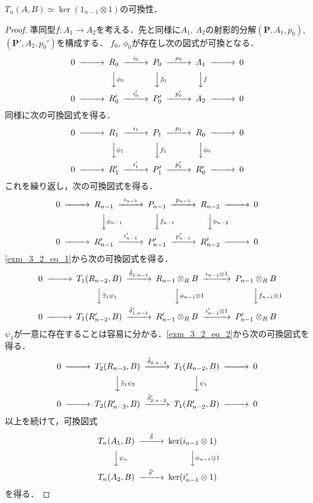\begin{screen}
  $T_n(A, B) \simeq \ker (1_{n-1} \otimes 1)$の可換性．
\end{screen}
\begin{proof}
  準同型$f \colon A_1 \to A_2$を考える．先と同様に$A_1$, $A_2$の射影的分解$(\boldsymbol{P}, A_1, p_0)$, $(\boldsymbol{P}', A_2, p_0')$を構成する．
  $f_0$, $\phi_0$が存在し次の図式が可換となる．
  \[
  \begin{CD}
    0 @>>> R_0 @>{i_0}>> P_0 @>{p_0}>> A_1 @>>> 0 \\
    @. @VV{\phi_0}V @VV{f_0}V @VV{f}V @. \\
    0 @>>> R_0' @>{i_0'}>> P_0' @>{p_0'}>> A_2 @>>> 0
  \end{CD}
  \]
  同様に次の可換図式を得る．
  \[
  \begin{CD}
    0 @>>> R_1 @>{i_1}>> P_1 @>{p_1}>> R_0 @>>> 0 \\
    @. @VV{\phi_1}V @VV{f_1}V @VV{\phi_0}V @. \\
    0 @>>> R_1' @>{i_1'}>> P_1' @>{p_1'}>> R_0' @>>> 0
  \end{CD}
  \]
  これを繰り返し，次の可換図式を得る．
  \begin{align}
    \begin{CD}
      0 @>>> R_{n-1} @>{i_{n-1}}>> P_{n-1} @>{p_{n-1}}>> R_{n-2} @>>> 0 \\
      @. @VV{\phi_{n-1}}V @VV{f_{n-1}}V @VV{\phi_{n-2}}V @. \\
      0 @>>> R_{n-1}' @>{i_{n-1}'}>> P_{n-1}' @>{p_{n-1}'}>> R_{n-2}' @>>> 0
    \end{CD}
    \label{exm_3_2_eq_3}
  \end{align}
  \eqref{exm_3_2_eq_1}から次の可換図式を得る．
  \[
  \begin{CD}
    0 @>>> T_1 (R_{n-2}, B) @>{\tilde{\delta}_{1, n-1}}>> R_{n-1} \otimes_R B @>{i_{n-1} \otimes 1}>> P_{n-1} \otimes_R B \\
    @. @VV{\exists_1\psi_1}V @VV{\phi_{n-1} \otimes 1}V @VV{f_{n-1} \otimes 1}V \\
    0 @>>> T_1 (R_{n-2}', B) @>{\tilde{\delta}_{1, n-1}'}>> R_{n-1}' \otimes_R B @>{i_{n-1}' \otimes 1}>> P_{n-1}' \otimes_R B
  \end{CD}
  \]
  $\psi_1$が一意に存在することは容易に分かる．\eqref{exm_3_2_eq_2}から次の可換図式を得る．
  \[
  \begin{CD}
    0 @>>> T_2 (R_{n-3}, B) @>{\tilde{\delta}_{2, n-2}}>> T_1 (R_{n-2}, B) @>>> 0 \\
    @. @VV{\exists_1\psi_2}V @VV{\psi_1}V \\
    0 @>>> T_2 (R_{n-3}', B) @>{\tilde{\delta}_{2, n-2}'}>> T_1 (R_{n-2}', B) @>>> 0
  \end{CD}
  \]
  以上を続けて，可換図式
  \[
  \begin{CD}
    T_n (A_1, B) @>{\tilde\delta}>>  \ker (i_{n-1} \otimes 1) \\
    @VV{\psi_n}V @VV{\phi_{n-1} \otimes 1}V \\
    T_n (A_2, B) @>{\tilde\delta'}>>  \ker (i_{n-1}' \otimes 1)
  \end{CD}
  \]
  を得る．
\end{proof}

